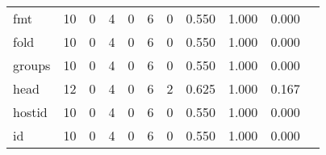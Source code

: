 \begin{longtable}{lp{1.2cm}p{1.2cm}p{1.2cm}p{1.2cm}p{1.2cm}p{1.2cm}p{1.2cm}p{1.2cm}p{1.2cm}p{1.2cm}}
fmt       &                                    10 &                                                  0 &                                                  4 &                                                  0 &                                                  6 &                                                  0 &                                         0.550 &                                              1.000 &                                              0.000 \\
fold      &                                    10 &                                                  0 &                                                  4 &                                                  0 &                                                  6 &                                                  0 &                                         0.550 &                                              1.000 &                                              0.000 \\
groups    &                                    10 &                                                  0 &                                                  4 &                                                  0 &                                                  6 &                                                  0 &                                         0.550 &                                              1.000 &                                              0.000 \\
head      &                                    12 &                                                  0 &                                                  4 &                                                  0 &                                                  6 &                                                  2 &                                         0.625 &                                              1.000 &                                              0.167 \\
hostid    &                                    10 &                                                  0 &                                                  4 &                                                  0 &                                                  6 &                                                  0 &                                         0.550 &                                              1.000 &                                              0.000 \\
id        &                                    10 &                                                  0 &                                                  4 &                                                  0 &                                                  6 &                                                  0 &                                         0.550 &                                              1.000 &                                              0.000 \\

\end{longtable}
